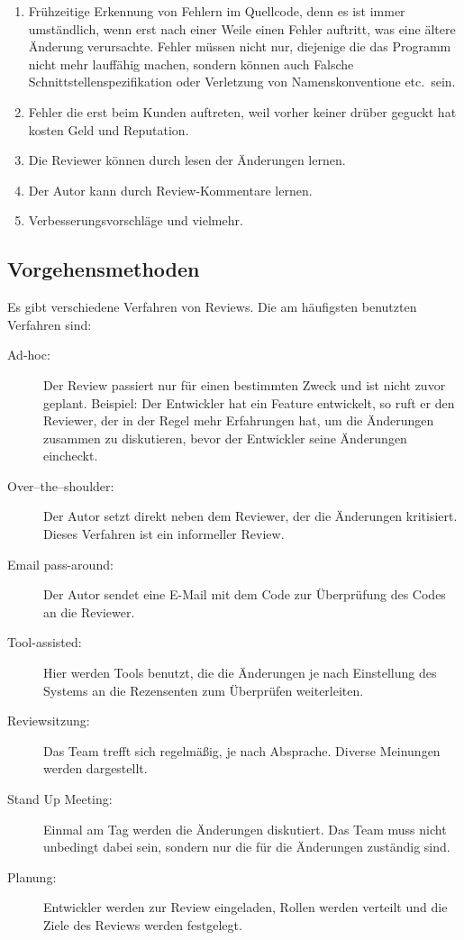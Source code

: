 \begin{enumerate}
	\item Frühzeitige Erkennung von Fehlern im Quellcode, denn es ist immer umständlich, wenn erst nach einer Weile einen Fehler auftritt, was eine ältere Änderung verursachte.
		Fehler müssen nicht nur, diejenige die das Programm nicht mehr lauffähig machen, sondern können auch Falsche Schnittstellenspezifikation oder Verletzung von Namenskonventione 
		etc.\ sein.
	\item Fehler die erst beim Kunden auftreten, weil vorher keiner drüber geguckt hat kosten Geld und Reputation.
	\item Die Reviewer können durch lesen der Änderungen lernen.
	\item Der Autor kann durch Review-Kommentare lernen.
	\item Verbesserungsvorschläge und vielmehr.
\end{enumerate}

\subsection{Vorgehensmethoden}
\label{subsec:Vorgehensmethoden}
Es gibt verschiedene Verfahren von Reviews. Die am häufigsten benutzten Verfahren sind:
\begin{description}
	\item [Ad-hoc:] Der Review passiert nur für einen bestimmten Zweck und ist nicht zuvor geplant. Beispiel: Der Entwickler hat ein Feature entwickelt, so ruft er den Reviewer, der in 				der Regel mehr Erfahrungen hat, um die Änderungen zusammen zu diskutieren, bevor der Entwickler seine Änderungen eincheckt.
	\item [Over–the–shoulder:] Der Autor setzt direkt neben dem Reviewer, der die Änderungen kritisiert. Dieses Verfahren ist ein informeller Review.
	\item [Email pass-around:] Der Autor sendet eine E-Mail mit dem Code zur Überprüfung des Codes an die Reviewer.
	\item [Tool-assisted:] Hier werden Tools benutzt, die die Änderungen je nach Einstellung des Systems an die Rezensenten zum Überprüfen weiterleiten.
	\item [Reviewsitzung:] Das Team trefft sich regelmäßig, je nach Absprache. Diverse Meinungen werden dargestellt.
	\item [Stand Up Meeting:] Einmal am Tag werden die Änderungen diskutiert. Das Team muss nicht unbedingt dabei sein, sondern nur die für die Änderungen zuständig sind.
	\item [Planung:] Entwickler werden zur Review eingeladen, Rollen werden verteilt und die Ziele des Reviews werden festgelegt.
\end{description}

